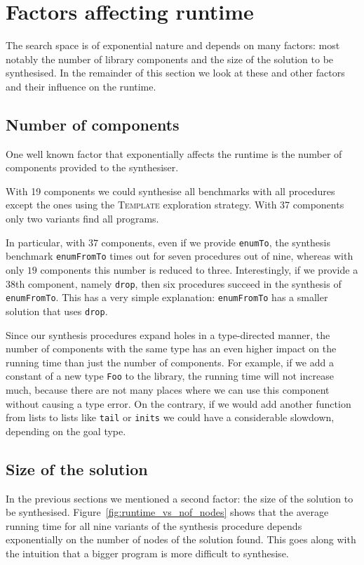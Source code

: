 \section{Factors affecting runtime}\label{Factors affecting runtime}
The search space is of exponential nature and depends on many factors: most notably the number of library components and the size of the solution to be synthesised. In the remainder of this section we look at these and other factors and their influence on the runtime.

\subsection{Number of components}
One well known factor that exponentially affects the runtime is the number of components provided to the synthesiser.

With 19 components we could synthesise all benchmarks with all procedures except the ones using the \textsc{Template} exploration strategy. With 37 components only two variants find all programs.

In particular, with $37$ components, even if we provide \lstinline?enumTo?, the synthesis benchmark \lstinline?enumFromTo? times out for seven procedures out of nine, whereas with only $19$ components this number is reduced to three.
Interestingly, if we provide a $38$th component, namely \lstinline?drop?, then six procedures succeed in the synthesis of \lstinline?enumFromTo?. This has a very simple explanation: \lstinline?enumFromTo? has a smaller solution that uses \lstinline?drop?.

Since our synthesis procedures expand holes in a type-directed manner, the number of components with the same type has an even higher impact on the running time than just the number of components. For example, if we add a constant of a new type \lstinline?Foo? to the library, the running time will not increase much, because there are not many places where we can use this component without causing a type error. On the contrary, if we would add another function from lists to lists like \lstinline?tail? or \lstinline?inits? we could have a considerable slowdown, depending on the goal type. 

\subsection{Size of the solution}
In the previous sections we mentioned a second factor: the size of the solution to be synthesised. Figure~\ref{fig:runtime_vs_nof_nodes} shows that the average running time for all nine variants of the synthesis procedure depends exponentially on the number of nodes of the solution found. This goes along with the intuition that a bigger program is more difficult to synthesise.

